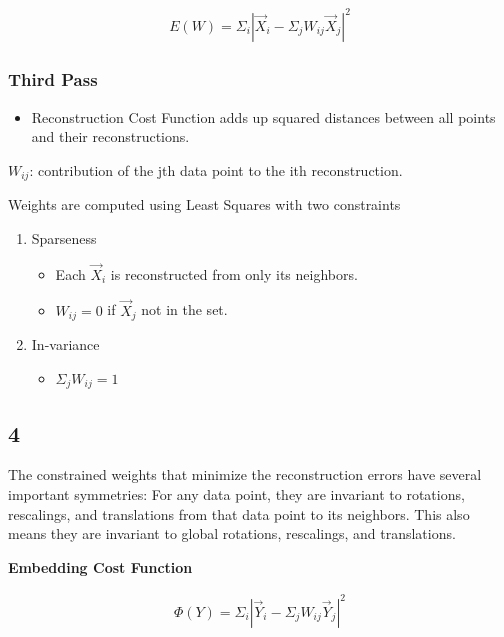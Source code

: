 \documentclass[11pt]{article}
\begin{document}
\begin{equation}
\begin{split}
E(W) = \Sigma_i |\vec X_i - \Sigma_j W_{ij} \vec X_j|^2 \label{eq:1}
\end{split}
\end{equation}

\subsubsection{Third Pass}
\label{sec:orgca3d201}
\begin{itemize}
\item Reconstruction Cost Function adds up squared distances between all points and
their reconstructions.
\end{itemize}

\(W_{ij}\): contribution of the jth data point to the ith reconstruction.

Weights are computed using Least Squares with two constraints
\begin{enumerate}
\item Sparseness
\begin{itemize}
\item Each \(\vec X_i\) is reconstructed from only its neighbors.
\item \(W_{ij} = 0\) if \(\vec X_j\) not in the set.
\end{itemize}
\item In-variance
\begin{itemize}
\item \(\Sigma_j W_{ij} = 1\)
\end{itemize}
\end{enumerate}

\subsection{4}
\label{sec:org5b82e5a}
The constrained weights that minimize the reconstruction errors have several
important symmetries: For any data point, they are invariant to rotations,
rescalings, and translations from that data point to its neighbors. This also
means they are invariant to global rotations, rescalings, and translations.


\textbf{Embedding Cost Function}

\begin{equation}
\begin{split}
\Phi(Y) = \Sigma_i |\vec Y_i - \Sigma_j W_{ij} \vec Y_j|^2 \label{eq:2}
\end{split}
\end{equation}
\end{document}

